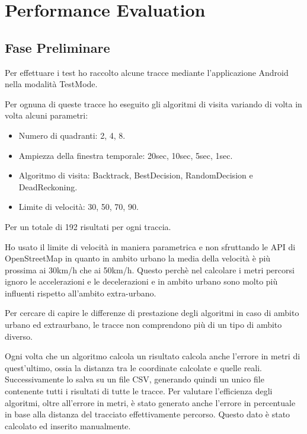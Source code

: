 \documentclass[12pt,a4paper,openright,twoside]{report}
\begin{document}
\clearpage{\pagestyle{empty}\cleardoublepage}
\chapter{Performance Evaluation}                %
\lhead[\fancyplain{}{\bfseries\thepage}]{\fancyplain{}{\bfseries\rightmark}}
\section{Fase Preliminare}
Per effettuare i test ho raccolto alcune tracce mediante l'applicazione Android nella modalità TestMode.

Per ognuna di queste tracce ho eseguito gli algoritmi di visita variando di volta in volta alcuni parametri:
\begin{itemize}
\item Numero di quadranti: 2, 4, 8.
\item Ampiezza della finestra temporale: 20sec, 10sec, 5sec, 1sec.
\item Algoritmo di visita: Backtrack, BestDecision, RandomDecision e DeadReckoning.
\item Limite di velocità: 30, 50, 70, 90.
\end{itemize}
Per un totale di 192 risultati per ogni traccia.

Ho usato il limite di velocità in maniera parametrica e non sfruttando le API di OpenStreetMap in quanto in ambito urbano la media della velocità è più prossima ai 30km/h che ai 50km/h. Questo perchè nel calcolare i metri percorsi ignoro le accelerazioni e le decelerazioni e in ambito urbano sono molto più influenti rispetto all'ambito extra-urbano.

Per cercare di capire le differenze di prestazione degli algoritmi in caso di ambito urbano ed extraurbano, le tracce non comprendono più di un tipo di ambito diverso. 

Ogni volta che un algoritmo calcola un risultato calcola anche l'errore in metri di quest'ultimo, ossia la distanza tra le coordinate calcolate e quelle reali. Successivamente lo salva su un file CSV, generando quindi un unico file contenente tutti i risultati di tutte le tracce.
Per valutare l'efficienza degli algoritmi, oltre all'errore in metri, è stato generato anche l'errore in percentuale in base alla distanza del tracciato effettivamente percorso. Questo dato è stato calcolato ed inserito manualmente.
\end{document}
